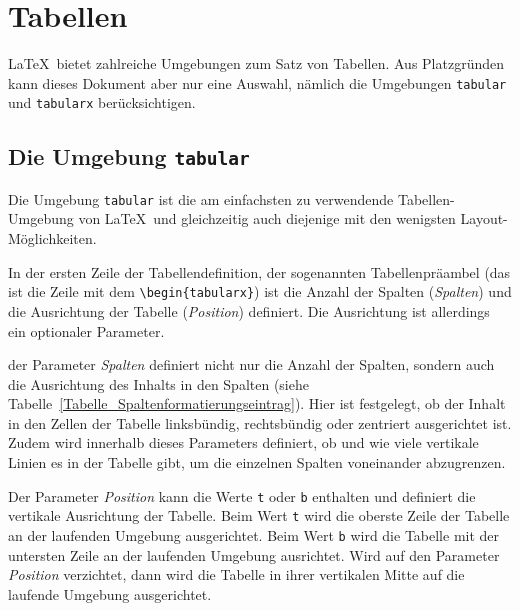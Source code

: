 \chapter{Tabellen}
\label{Kapitel_Tabellen}

\LaTeX\ bietet zahlreiche Umgebungen zum Satz von Tabellen. Aus Platzgründen kann dieses Dokument aber nur eine Auswahl, nämlich die Umgebungen \verb!tabular!
und \verb!tabularx! berücksichtigen.



\section{Die Umgebung \texttt{tabular}}

Die Umgebung \verb!tabular! ist 
die am einfachsten zu verwendende Tabellen-Umgebung von \LaTeX\ und gleichzeitig 
auch diejenige mit den wenigsten Layout-Möglichkeiten. 




In der ersten Zeile der Tabellendefinition, 
der sogenannten Tabellenpräambel 
(das ist die Zeile mit 
dem \verb!\begin{tabularx}!) ist die Anzahl der Spalten (\textsl{Spalten}) 
und die Ausrichtung der Tabelle (\textsl{Position}) 
definiert. Die Ausrichtung ist allerdings ein optionaler Parameter.

der Parameter \textsl{Spalten} definiert nicht nur die
Anzahl der Spalten, sondern auch die 
Ausrichtung des Inhalts in den Spalten (siehe 
Tabelle~\ref{Tabelle_Spaltenformatierungseintrag}).
Hier ist festgelegt, ob der Inhalt in den Zellen 
der Tabelle linksbündig, rechtsbündig oder 
zentriert ausgerichtet ist. Zudem wird innerhalb dieses Parameters
definiert, ob und wie viele vertikale Linien es in der Tabelle gibt,
um die einzelnen Spalten voneinander abzugrenzen.



Der Parameter \textsl{Position} 
kann die Werte \verb!t! oder \verb!b!
enthalten und definiert die vertikale 
Ausrichtung der Tabelle. 
Beim Wert 
\verb!t! wird die oberste Zeile
der Tabelle an der laufenden Umgebung 
ausgerichtet. Beim Wert \verb!b!
wird die Tabelle 
mit der untersten Zeile an der
laufenden Umgebung ausrichtet. 
Wird auf den Parameter \textsl{Position} 
verzichtet, dann wird die Tabelle in ihrer
vertikalen Mitte auf die laufende 
Umgebung ausgerichtet. 

